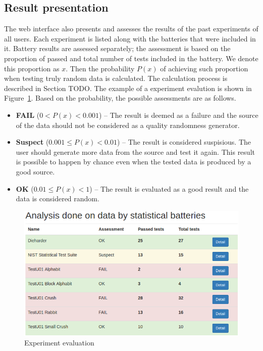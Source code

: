 \documentclass[
  digital,  	%
  color,		%
  oneside,   	%
  12pt,
  nocover,
  notable,
  nolof,
  nolot,
]{fithesis3}
\theoremstyle{definition}
\theoremstyle{remark}
\begin{document}
\subsection*{Result presentation}
The web interface also presents and assesses the results of the past experiments of all users. Each experiment is listed along with the batteries that were included in it. Battery results are assessed separately; the assessment is based on the proportion of passed and total number of tests included in the battery. We denote this proportion as $x$. Then the probability $P(x)$ of achieving such proportion when testing truly random data is calculated. The calculation process is described in Section TODO. The example of a experiment evalution is shown in Figure~\ref{fig:rtt_assessment}. Based on the probability, the possible assessments are as follows.

\begin{itemize}
\item \textbf{FAIL} ($0 < P(x) < 0.001$) -- The result is deemed as a failure and the source of the data should not be considered as a quality randomness generator.
\item \textbf{Suspect} ($0.001 \leq P(x) < 0.01$) -- The result is considered suspisious. The user should generate more data from the source and test it again. This result is possible to happen by chance even when the tested data is produced by a good source.
\item \textbf{OK} ($0.01 \leq P(x) < 1$) -- The result is evaluated as a good result and the data is considered random.
\end{itemize}

\begin{figure}[H]
\begin{nomar}
\centering
\includegraphics[width=\textwidth]{figures/rtt-assessment.png} 
\end{nomar}
\caption{Experiment evaluation}
\label{fig:rtt_assessment}
\end{figure}
\end{document}
